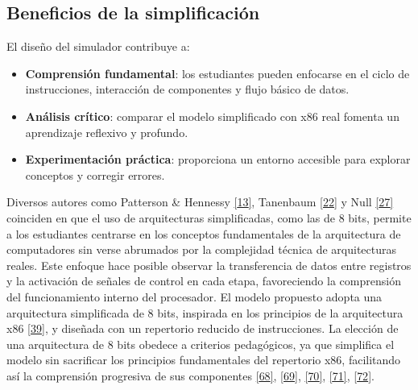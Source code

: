 \documentclass[12pt,oneside]{templates/unerthesis}
\providecommand{\tightlist}{%
  \setlength{\itemsep}{0pt}\setlength{\parskip}{0pt}}
\begin{document}
\hypertarget{beneficios-de-la-simplificaciuxf3n}{%
\subsection{Beneficios de la simplificación}\label{beneficios-de-la-simplificaciuxf3n}}

El diseño del simulador contribuye a:

\begin{itemize}
\tightlist
\item
  \textbf{Comprensión fundamental}: los estudiantes pueden enfocarse en el ciclo de instrucciones, interacción de componentes y flujo básico de datos.
\item
  \textbf{Análisis crítico}: comparar el modelo simplificado con x86 real fomenta un aprendizaje reflexivo y profundo.
\item
  \textbf{Experimentación práctica}: proporciona un entorno accesible para explorar conceptos y corregir errores.
\end{itemize}

Diversos autores como Patterson \& Hennessy \protect\hyperlink{ref-hennessy2017computer}{{[}13{]}}, Tanenbaum \protect\hyperlink{ref-tanenbaum_structured_2016}{{[}22{]}} y Null \protect\hyperlink{ref-null_essentials_2023}{{[}27{]}} coinciden en que el uso de arquitecturas simplificadas, como las de 8 bits, permite a los estudiantes centrarse en los conceptos fundamentales de la arquitectura de computadores sin verse abrumados por la complejidad técnica de arquitecturas reales. Este enfoque hace posible observar la transferencia de datos entre registros y la activación de señales de control en cada etapa, favoreciendo la comprensión del funcionamiento interno del procesador.
El modelo propuesto adopta una arquitectura simplificada de 8 bits, inspirada en los principios de la arquitectura x86 \protect\hyperlink{ref-intel_microarchitecture_2021}{{[}39{]}}, y diseñada con un repertorio reducido de instrucciones. La elección de una arquitectura de 8 bits obedece a criterios pedagógicos, ya que simplifica el modelo sin sacrificar los principios fundamentales del repertorio x86, facilitando así la comprensión progresiva de sus componentes \protect\hyperlink{ref-patt2019introduction}{{[}68{]}}, \protect\hyperlink{ref-majid1999design}{{[}69{]}}, \protect\hyperlink{ref-morlan_sap1_2021}{{[}70{]}}, \protect\hyperlink{ref-Guald_2015_thesis}{{[}71{]}}, \protect\hyperlink{ref-silber_tinycpu}{{[}72{]}}.
\end{document}
